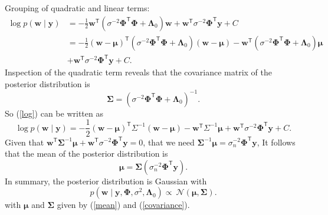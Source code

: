 Grouping of quadratic and linear terms:
\begin{equation}
\label{log}
    \begin{aligned}
\log p(\boldsymbol{w} \mid \boldsymbol{y})
& =
    -\frac{1}{2}
    \boldsymbol{w}^\mathsf{T}
    \left( \sigma^{-2} \boldsymbol{\Phi}^\mathsf{T} \boldsymbol{\Phi} + \boldsymbol{\Lambda}_0 \right)
    \boldsymbol{w}
    + \boldsymbol{w}^\mathsf{T}
    \sigma^{-2} \boldsymbol{\Phi}^\mathsf{T} \boldsymbol{y} + C
\\
& =
    -\frac{1}{2}
    (\boldsymbol{w} - \boldsymbol{\mu})^\mathsf{T} \left( \sigma^{-2} \boldsymbol{\Phi}^\mathsf{T} \boldsymbol{\Phi} + \boldsymbol{\Lambda}_0 \right) (\boldsymbol{w} - \boldsymbol{\mu})
    - \boldsymbol{w}^\mathsf{T} \left( \sigma^{-2} \boldsymbol{\Phi}^\mathsf{T} \boldsymbol{\Phi} + \boldsymbol{\Lambda}_0 \right) \boldsymbol{\mu} \\
&     + \boldsymbol{w}^\mathsf{T} \sigma^{-2} \boldsymbol{\Phi}^\mathsf{T} \boldsymbol{y} + C.
\end{aligned}
\end{equation}
Inspection of the quadratic term reveals that the covariance matrix of the posterior distribution is
\begin{equation}
\label{covariance}
    \boldsymbol{\Sigma} = \left( \sigma^{-2} \boldsymbol{\Phi}^\mathsf{T} \boldsymbol{\Phi} + \boldsymbol{\Lambda}_0 \right)^{-1}.
\end{equation}
So (\ref{log}) can be written as
\begin{equation}
    \log p(\boldsymbol{w} \mid \boldsymbol{y}) = -\frac{1}{2}
    (\boldsymbol{w} - \boldsymbol{\mu})^\mathsf{T} \Sigma^{-1} (\boldsymbol{w} - \boldsymbol{\mu})
    - \boldsymbol{w}^\mathsf{T} \Sigma^{-1} \boldsymbol{\mu}
    + \boldsymbol{w}^\mathsf{T} \sigma^{-2} \boldsymbol{\Phi}^\mathsf{T} \boldsymbol{y} + C.
\end{equation}
Given that $\boldsymbol{w}^\mathsf{T} \boldsymbol{\Sigma}^{-1} \boldsymbol{\mu}
    + \boldsymbol{w}^\mathsf{T} \sigma^{-2} \boldsymbol{\Phi}^\mathsf{T} \boldsymbol{y} = 0$, that we need $\boldsymbol{\Sigma}^{-1} \boldsymbol{\mu} = \sigma_n^{-2} \boldsymbol{\Phi}^\mathsf{T} \boldsymbol{y}$,
It follows that the mean of the posterior distribution is
\begin{equation}
\label{mean}
    \boldsymbol{\mu} = \boldsymbol{\Sigma} \left( \sigma_n^{-2} \boldsymbol{\Phi}^\mathsf{T} \boldsymbol{y} \right).
\end{equation}
In summary, the posterior distribution is Gaussian with
\begin{equation}
    p(\boldsymbol{w}\mid \boldsymbol{y}, \boldsymbol{\Phi}, \sigma^2, \boldsymbol{\Lambda}_0) \propto\ \mathcal{N}(\boldsymbol{\mu}, \boldsymbol{\Sigma}).
\end{equation}
with $\boldsymbol{\mu}$ and $\boldsymbol{\Sigma}$ given by (\ref{mean}) and (\ref{covariance}).

